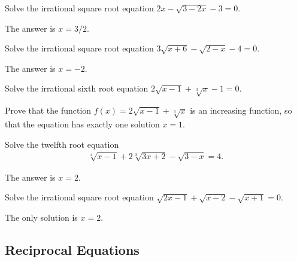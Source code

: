 \documentclass[12pt,a4paper]{memoir}
\theoremstyle{definition}
\begin{document}
\begin{question}\label{p:irrational-V}
	Solve the irrational square root equation $2x-\sqrt{3-2x}-3=0$.
\end{question}

\begin{solution}
	The answer is $x=3/2$.
\end{solution}

\begin{question}\label{p:irrational-W}
	Solve the irrational square root equation $3\sqrt{x+6}-\sqrt{2-x}-4=0$.
\end{question}


\begin{solution}
	The answer is $x=-2$.
\end{solution}


\begin{question}\label{p:irrational-X}
	Solve the irrational sixth root equation $2\sqrt{x-1}+\sqrt[3]{x}-1=0$.
\end{question}

\begin{solution}
	Prove that the function $f(x)=2\sqrt{x-1}+\sqrt[3]{x}$ is an increasing function, so that the equation has exactly one solution $x=1$. 
\end{solution}


\begin{question}\label{p:irrational-Y}
	Solve the twelfth root equation
	\begin{align*}
		\sqrt[4]{x-1}+2\sqrt[3]{3x+2}-\sqrt{3-x}=4.
	\end{align*}
\end{question}

\begin{solution}
	The answer is $x=2$.
\end{solution}

\begin{question}\label{p:irrational-Z}
	Solve the irrational square root equation $\sqrt{2x-1}+\sqrt{x-2}-\sqrt{x+1}=0$.
\end{question}


\begin{solution}
	The only solution is $x=2$.
\end{solution}





\subsection{Reciprocal Equations}
\end{document}
